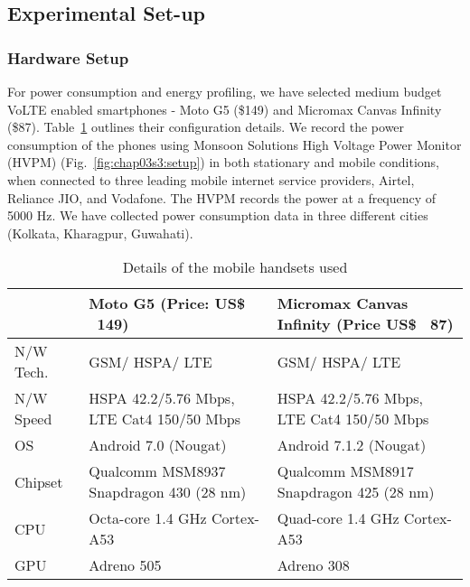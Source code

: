 
\subsection{Experimental Set-up}
\subsubsection{Hardware Setup}
For power consumption and energy profiling, we have selected medium budget VoLTE enabled smartphones -  Moto G5  (\$149) and Micromax Canvas Infinity (\$87). Table~\ref{tab:chap03s3:handset_details} outlines their configuration details. We record the power consumption of the phones using Monsoon Solutions High Voltage Power Monitor (HVPM) \cite{HVPM, Yang2018,Geng2015} (Fig.~\ref{fig:chap03s3:setup}) in both stationary and mobile conditions, when connected to three leading mobile internet service providers, Airtel, Reliance JIO, and Vodafone. The \ac{HVPM} records the power at a frequency of 5000 Hz. We have collected power consumption data in three different cities (Kolkata, Kharagpur, Guwahati).
\begin{table}[!h]
    \scriptsize
    \centering
      \caption{Details of the mobile handsets used}
    \begin{tabular}{|p{0.6cm}||p{3.4cm}|p{3.4cm}|}
    \hline
         \textbf{}  & \textbf{Moto G5 (Price: US\$ ~149)} & \textbf{Micromax Canvas Infinity (Price US\$ ~87)}\\
          \hline \hline 
         N/W Tech. & GSM/ HSPA/ LTE &  GSM/ HSPA/ LTE\\ \hline
         N/W Speed & HSPA 42.2/5.76 Mbps, LTE Cat4 150/50 Mbps & HSPA 42.2/5.76 Mbps, LTE Cat4 150/50 Mbps\\ \hline
         OS & Android 7.0 (Nougat) & Android 7.1.2 (Nougat) \\ \hline
         Chipset & Qualcomm MSM8937 Snapdragon 430 (28 nm) & Qualcomm MSM8917 Snapdragon 425 (28 nm)\\ \hline
         CPU & Octa-core 1.4 GHz Cortex-A53 & Quad-core 1.4 GHz Cortex-A53\\ \hline
         GPU & Adreno 505 & Adreno 308\\ \hline
    \end{tabular}
    \label{tab:chap03s3:handset_details}
\end{table}
